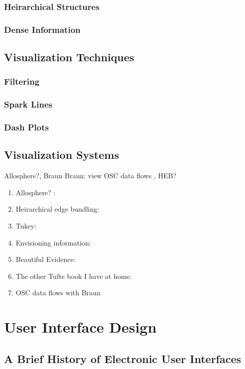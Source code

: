 		\subsubsection{Heirarchical Structures}
		\subsubsection{Dense Information}
	\subsection{Visualization Techniques}
		\subsubsection{Filtering}
		\subsubsection{Spark Lines}
		\subsubsection{Dash Plots}
	\subsection{Visualization Systems}
		Allosphere?, Braun Braun: view OSC data flows , HEB?
	\begin{enumerate}
		\item Allosphere? :
		\item Heirarchical edge bundling: 
		\item Tukey: 
		\item Envisioning information: 
		\item Beautiful Evidence: 
		\item The other Tufte book I have at home.
		\item OSC data flows with Braun 
	\end{enumerate}

\section{User Interface Design}
	\subsection{A Brief History of Electronic User Interfaces}
